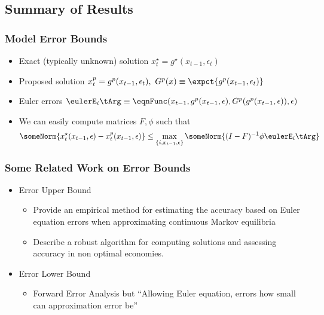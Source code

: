\documentclass[notheorems]{beamer}
\begin{document}
\subsection{Summary of Results}
\label{sec:summary-results}




\begin{frame}
  \frametitle{Model Error Bounds}
  \begin{itemize}
  \item Exact (typically unknown) solution $x^\star_t=g^\star(x_{t-1},\epsilon_t)$ 
  \item Proposed solution  $x^p_t=g^p(x_{t-1},\epsilon_t), \,\,G^p(x)\equiv \expct{g^p(x_{t-1},\epsilon_t)}$ 
 \item Euler errors $\eulerE_i\tArg \equiv  \eqnFunc(x_{t-1},g^p(x_{t-1},\epsilon),G^p(g^p(x_{t-1},\epsilon)),\epsilon)$
 \item We can easily compute matrices  $F, \phi $ such that 
 {\small   \begin{gather*}
 \someNorm{ x^\star_{t}(x_{t-1},\epsilon) -	 x^p_{t}(x_{t-1},\epsilon)} \le 
 \max_{\{i,x_{t-1},\epsilon\}} \someNorm{(I-F)^{-1} \phi \eulerE_i\tArg }
    \end{gather*}}
  \end{itemize}
\end{frame}
\begin{frame}
  \frametitle{Some Related Work on Error Bounds}
  \begin{itemize}
  \item \cite{peralta-alva14} Error Upper Bound
    \begin{itemize}
\item Provide an empirical method for estimating the accuracy based on Euler equation errors when approximating continuous Markov equilibria
    \item Describe a robust algorithm for computing solutions and assessing accuracy in non optimal economies.\cite{feng14:_num}
    \end{itemize}
  \item \cite{judd2017lower} Error Lower Bound
    \begin{itemize}
    \item Forward Error Analysis but ``Allowing Euler equation, errors how small can approximation error be''
    \end{itemize}
  \end{itemize}
\end{frame}
\end{document}
